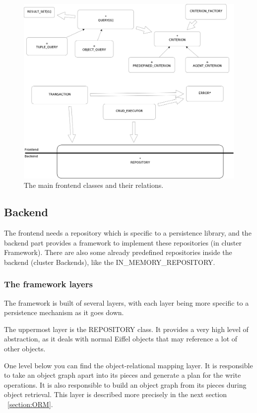 \begin{figure} [h]
\centering
\includegraphics[trim= 0mm -10mm 0mm -10mm,clip, width = 13cm] {includes/frontend.png}
\caption{The main frontend classes and their relations.}
\label{fig:frontend_classes}
\end{figure}


\subsection{Backend}

The frontend needs a repository which is specific to a persistence library, and the backend part provides a framework to implement these repositories (in cluster Framework).
There are also some already predefined repositories inside the backend (cluster Backends), like the IN\_MEMORY\_REPOSITORY.

\subsubsection{The framework layers}

The framework is built of several layers, with each layer being more specific to a persistence mechanism as it goes down.

The uppermost layer is the REPOSITORY class. 
It provides a very high level of abstraction, as it deals with normal Eiffel objects that may reference a lot of other objects.

One level below you can find the object-relational mapping layer.
It is responsible to take an object graph apart into its pieces and generate a plan for the write operations.
It is also responsible to build an object graph from its pieces during object retrieval.
This layer is described more precisely in the next section ~\ref{section:ORM}.

